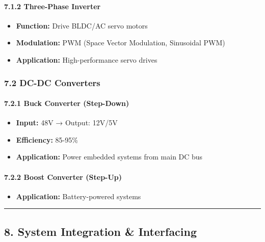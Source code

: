 \documentclass[
]{article}
\providecommand{\tightlist}{%
  \setlength{\itemsep}{0pt}\setlength{\parskip}{0pt}}
\begin{document}
\hypertarget{three-phase-inverter}{%
\paragraph{7.1.2 Three-Phase Inverter}\label{three-phase-inverter}}

\begin{itemize}
\tightlist
\item
  \textbf{Function:} Drive BLDC/AC servo motors
\item
  \textbf{Modulation:} PWM (Space Vector Modulation, Sinusoidal PWM)
\item
  \textbf{Application:} High-performance servo drives
\end{itemize}

\hypertarget{dc-dc-converters}{%
\subsubsection{7.2 DC-DC Converters}\label{dc-dc-converters}}

\hypertarget{buck-converter-step-down}{%
\paragraph{7.2.1 Buck Converter
(Step-Down)}\label{buck-converter-step-down}}

\begin{itemize}
\tightlist
\item
  \textbf{Input:} 48V → Output: 12V/5V
\item
  \textbf{Efficiency:} 85-95\%
\item
  \textbf{Application:} Power embedded systems from main DC bus
\end{itemize}

\hypertarget{boost-converter-step-up}{%
\paragraph{7.2.2 Boost Converter
(Step-Up)}\label{boost-converter-step-up}}

\begin{itemize}
\tightlist
\item
  \textbf{Application:} Battery-powered systems
\end{itemize}

\begin{center}\rule{0.5\linewidth}{0.5pt}\end{center}

\hypertarget{system-integration-interfacing}{%
\subsection{8. System Integration \&
Interfacing}\label{system-integration-interfacing}}
\end{document}
